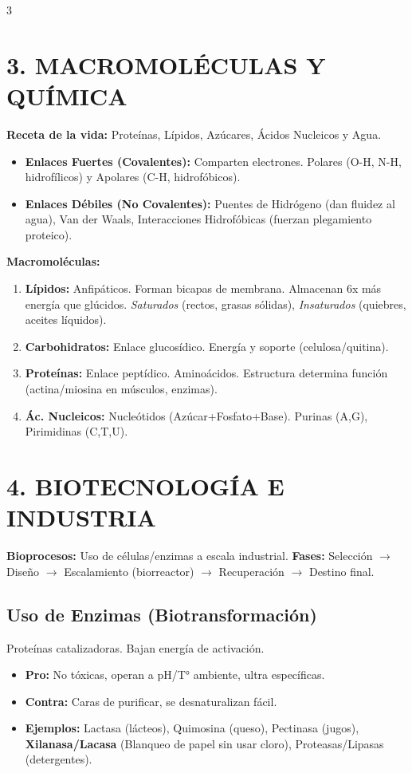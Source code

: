 \documentclass[11pt,landscape,letterpaper]{extarticle}
\begin{document}
\begin{multicols*}{3}
	\section{3. MACROMOLÉCULAS Y QUÍMICA}
	\textbf{Receta de la vida:} Proteínas, Lípidos, Azúcares, Ácidos Nucleicos y Agua.
	\begin{itemize}
		\item \textbf{Enlaces Fuertes (Covalentes):} Comparten electrones. Polares (O-H, N-H, hidrofílicos) y Apolares (C-H, hidrofóbicos).
		\item \textbf{Enlaces Débiles (No Covalentes):} Puentes de Hidrógeno (dan fluidez al agua), Van der Waals, Interacciones Hidrofóbicas (fuerzan plegamiento proteico).
	\end{itemize}
	\textbf{Macromoléculas:}
	\begin{enumerate}
		\item \textbf{Lípidos:} Anfipáticos. Forman bicapas de membrana. Almacenan 6x más energía que glúcidos. \textit{Saturados} (rectos, grasas sólidas), \textit{Insaturados} (quiebres, aceites líquidos).
		\item \textbf{Carbohidratos:} Enlace glucosídico. Energía y soporte (celulosa/quitina).
		\item \textbf{Proteínas:} Enlace peptídico. Aminoácidos. Estructura determina función (actina/miosina en músculos, enzimas).
		\item \textbf{Ác. Nucleicos:} Nucleótidos (Azúcar+Fosfato+Base). Purinas (A,G), Pirimidinas (C,T,U).
	\end{enumerate}

	\section{4. BIOTECNOLOGÍA E INDUSTRIA}
	\textbf{Bioprocesos:} Uso de células/enzimas a escala industrial.
	\textbf{Fases:} Selección $\rightarrow$ Diseño $\rightarrow$ Escalamiento (biorreactor) $\rightarrow$ Recuperación $\rightarrow$ Destino final.

	\subsection{Uso de Enzimas (Biotransformación)}
	Proteínas catalizadoras. Bajan energía de activación.
	\begin{itemize}
		\item \textbf{Pro:} No tóxicas, operan a pH/T° ambiente, ultra específicas.
		\item \textbf{Contra:} Caras de purificar, se desnaturalizan fácil.
		\item \textbf{Ejemplos:} Lactasa (lácteos), Quimosina (queso), Pectinasa (jugos), \textbf{Xilanasa/Lacasa} (Blanqueo de papel sin usar cloro), Proteasas/Lipasas (detergentes).
	\end{itemize}


\end{multicols*}
\end{document}
